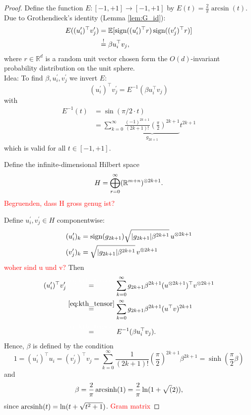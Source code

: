 \begin{proof}
	Define the function $E: [-1,+1] \to [-1,+1]$ by $E(t)=\frac{2}{\pi}\arcsin(t)$. Due to Grothendieck's identity (Lemma \ref{lem:G_id}):
	\begin{align*}
		E((u_i^\prime)^\top v_j^\prime ) &= \mathbb{E}[\operatorname{sign}((u_i^\prime)^\top r)\operatorname{sign}((v_j^\prime)^\top r)]\\
		&\overset{!}{=}\beta u_i^\top v_j,
	\end{align*}
	where $r\in\mathbb{R}^d$ is a random unit vector chosen form the $O(d)$-invariant probability distribution on the unit sphere.\\
	
	Idea: To find $\beta,u_i^\prime,v_j^\prime$ we invert $E$:
	\[
		(u_i^\prime)^\top v_j^\prime = E^{-1} (\beta u_i^\top v_j)	
	\]
	with 
	\begin{align*}
		E^{-1}(t) &= \sin(\pi/2 \cdot t) \\
		&= \sum_{k=0}^\infty \underbrace{\frac{(-1)^{2k+1}}{(2k+1)!}\left(\frac{\pi}{2}\right)^{2k+1}}_{g_{2k+1}}  t^{2k+1}
	\end{align*}
	which is valid for all $t\in[-1,+1]$.
	
	Define the infinite-dimensional Hilbert space
	\begin{equation}
		H= \bigoplus_{r=0}^\infty (\mathbb{R}^{m+n})^{\otimes 2k+1}.
	\end{equation}
	\textcolor{red}{Begruenden, dass H gross genug ist?}
	
	Define $u_i^\prime, v_j^\prime\in H$ componentwise:
	\begin{align*}
		(u_i^\prime)_k &= \operatorname{sign}(g_{2k+1}) \sqrt{{\left|{g_{2k+1}}\right|}\beta^{2k+1}}\, u^{\otimes 2k+1} \\
		(v_j^\prime)_k &= \sqrt{{\left|{g_{2k+1}}\right|}\beta^{2k+1}} \,v^{\otimes 2k+1}
	\end{align*}
	\textcolor{red}{woher sind u und v?}
	Then 
	\begin{align*}
		(u_i^\prime)^\top v_j^\prime &\overset{\textcolor{white}{\eqref*{eq:kth_tensor}}}{=} \sum_{k=0}^\infty g_{2k+1} \beta^{2k+1}(u^{\tensor 2k+1})^\top v^{\tensor 2k+1} \\
		&\overset{\eqref{eq:kth_tensor}}{=} \sum_{k=0}^\infty g_{2k+1} \beta^{2k+1} (u^\top v)^{2k+1} \\
		&\overset{\textcolor{white}{\eqref*{eq:kth_tensor}}}{=} E^{-1}(\beta u_i^\top v_j).
	\end{align*}
	Hence, $\beta$ is defined by the condition
	\[
		1 = (u_i^\prime)^\top u_i = (v_j^\prime)^\top v_j 
		= \sum_{k=0}^\infty \frac{1}{(2k+1)!}\left(\frac{\pi}{2}\right)^{2k+1}\beta^{2k+1}=\sinh(\frac{\pi}{2}\beta)
	\]
	and
	\[
		\beta = \frac{2}{\pi} \operatorname{arcsinh}(1) = \frac{2}{\pi}\ln(1+\sqrt(2)),	
	\]
	since $\operatorname{arcsinh} (t) = \ln(t+\sqrt{t^2+1})$.
	\textcolor{red}{Gram matrix}
\end{proof}
\newpage